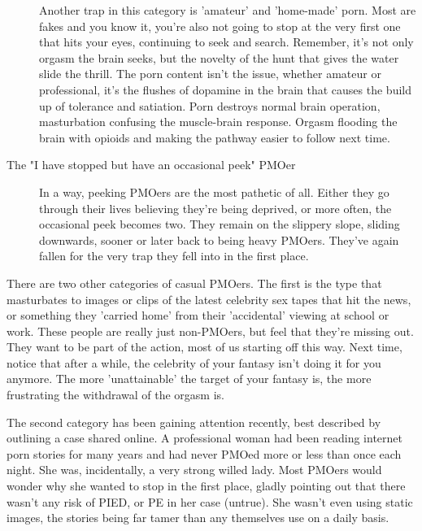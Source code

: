 \documentclass[easypeasy]{subfiles}
\begin{document}
\begin{description}
  Another trap in this category is 'amateur' and 'home-made' porn. Most are fakes and you know it, you're also not going to stop at the very first one that hits your eyes, continuing to seek and search. Remember, it's not only orgasm the brain seeks, but the novelty of the hunt that gives the water slide the thrill. The porn content isn't the issue, whether amateur or professional, it's the flushes of dopamine in the brain that causes the build up of tolerance and satiation. Porn destroys normal brain operation, masturbation confusing the muscle-brain response. Orgasm flooding the brain with opioids and making the pathway easier to follow next time.

\item[The "I have stopped but have an occasional peek" PMOer] In a way, peeking PMOers are the most pathetic of all. Either they go through their lives believing they're being deprived, or more often, the occasional peek becomes two. They remain on the slippery slope, sliding downwards, sooner or later back to being heavy PMOers. They've again fallen for the very trap they fell into in the first place.
 \end{description}

There are two other categories of casual PMOers. The first is the type that masturbates to images or clips of the latest celebrity sex tapes that hit the news, or something they 'carried home' from their 'accidental' viewing at school or work. These people are really just non-PMOers, but feel that they're missing out. They want to be part of the action, most of us starting off this way. Next time, notice that after a while, the celebrity of your fantasy isn't doing it for you anymore. The more 'unattainable' the target of your fantasy is, the more frustrating the withdrawal of the orgasm is.

The second category has been gaining attention recently, best described by outlining a case shared online. A professional woman had been reading internet porn stories for many years and had never PMOed more or less than once each night. She was, incidentally, a very strong willed lady. Most PMOers would wonder why she wanted to stop in the first place, gladly pointing out that there wasn't any risk of PIED, or PE in her case (untrue). She wasn't even using static images, the stories being far tamer than any themselves use on a daily basis.
\end{document}
